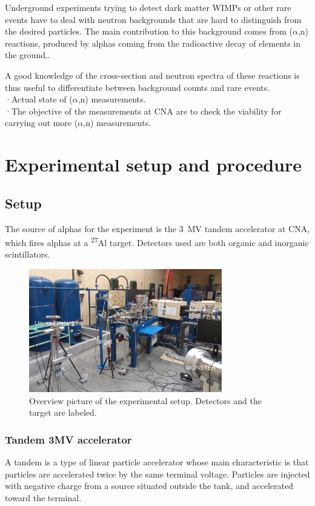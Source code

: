 \documentclass[a4paper,12pt]{report}
\newcommand{\an}{($\alpha$,n) }
\newcommand{\Aliso}{\textsuperscript{27}Al }
\begin{document}
Underground experiments trying to detect dark matter WIMPs or other rare events have to deal with neutron backgrounds that are hard to distinguish from the desired particles.
The main contribution to this background comes from \an reactions, produced by alphas coming from the radioactive decay of elements in the ground.\cite{neutron_in_an}.	%

A good knowledge of the cross-section and neutron spectra of these reactions is thus useful to differentiate between background counts and rare events.
\\

·Actual state of \an measurements.\\

·The objective of the measurements at CNA are to check the viability for carrying out more \an measurements.\\


\chapter{Experimental setup and procedure}
\section{Setup}
The source of alphas for the experiment is the \qty{3}{\mega\volt} tandem accelerator at CNA, which fires alphas at a \Aliso target.
Detectors used are both organic and inorganic scintillators.

\begin{figure}[H]
	\centering
	\includegraphics[width=0.75\textwidth]{overview_photo.jpg}
	\caption{Overview picture of the experimental setup.
	Detectors and the target are labeled.}
	\label{overview_photo}
\end{figure}

\subsection{Tandem 3MV accelerator}
A tandem is a type of linear particle accelerator whose main characteristic is that particles are accelerated twice by the same terminal voltage.
Particles are injected with negative charge from a source situated outside the tank, and accelerated toward the terminal.
\end{document}
